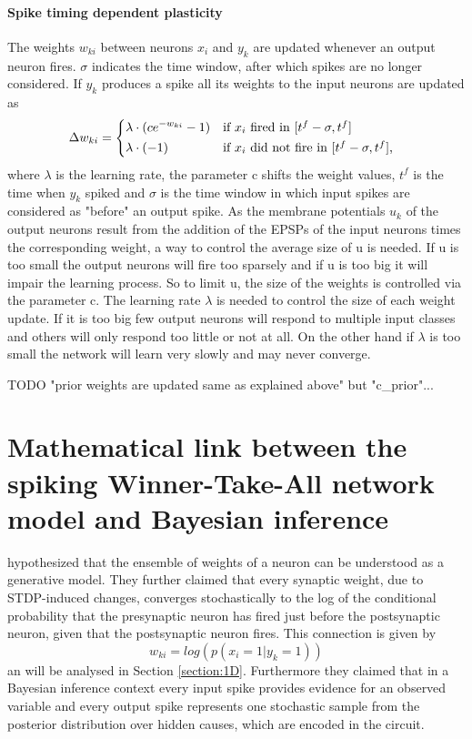 \paragraph{Spike timing dependent plasticity}
The weights $w_{ki}$ between neurons $x_i$ and $y_k$ are updated whenever an output neuron fires. $\sigma$ indicates the time window, after which spikes are no longer considered. If $y_k$ produces a spike all its weights to the input neurons are updated as
\begin{equation}
\label{deltawki}
\Delta w_{ki} = \begin{dcases*} \lambda \cdot (ce^{-w_{ki}} - 1) & if $x_{i}$ fired in $ [t^f - \sigma, t^f] $ \\
\lambda \cdot (-1) & \text{if $ x_i $ did not fire in $ [t^f - \sigma, t^f] $, } \end{dcases*}
\end{equation}
where $\lambda$ is the learning rate, the parameter c shifts the weight values, $t^f$ is the time when $y_k$ spiked and $\sigma$ is the time window in which input spikes are considered as "before" an output spike. As the membrane potentials $u_k$ of the output neurons result from the addition of the EPSPs of the input neurons times the corresponding weight, a way to control the average size of u is needed. If u is too small the output neurons will fire too sparsely and if u is too big it will impair the learning process. So to limit u, the size of the weights is controlled via the parameter c. The learning rate $\lambda$ is needed to control the size of each weight update. If it is too big few output neurons will respond to multiple input classes and others will only respond too little or not at all. On the other hand if $\lambda$ is too small the network will learn very slowly and may never converge.

TODO "prior weights are updated same as explained above" but "c_prior"...

\section{Mathematical link between the spiking Winner-Take-All network model and Bayesian inference}
\label{linkNetworkBayes}

\citet{nessler} hypothesized that the ensemble of weights of a neuron can be understood as a generative model. They further claimed that every synaptic weight, due to STDP-induced changes,  converges stochastically to the log of the conditional probability that the presynaptic neuron has fired just before the postsynaptic neuron, given that the postsynaptic neuron fires. This connection is given by
\begin{equation}
 w_{ki} = log(p(x_i = 1 | y_k = 1))
\end{equation}
an will be analysed in Section \ref{section:1D}.
Furthermore they claimed that in a Bayesian inference context every input spike provides evidence for an observed variable and every output spike represents one stochastic sample from the posterior distribution over hidden causes, which are encoded in the circuit. 

